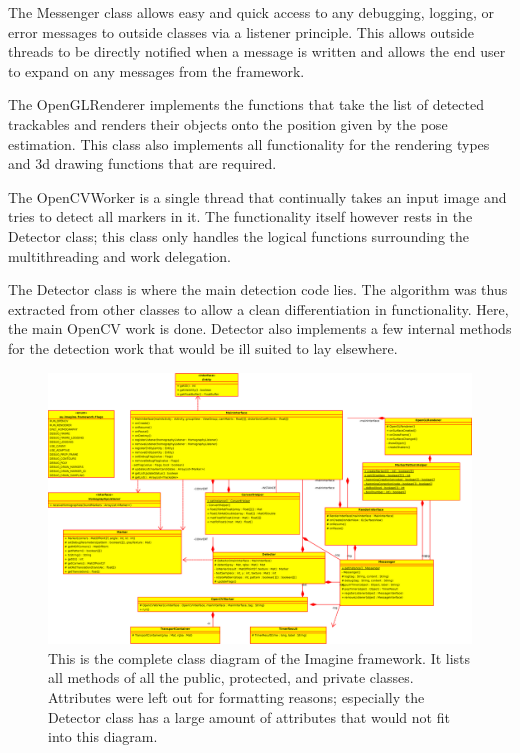 The Messenger class allows easy and quick access to any debugging, logging, or error messages to outside classes via a listener principle.
This allows outside threads to be directly notified when a message is written and allows the end user to expand on any messages from the framework.

The OpenGLRenderer implements the functions that take the list of detected trackables and renders their objects onto the position given by the pose estimation.
This class also implements all functionality for the rendering types and 3d drawing functions that are required.

The OpenCVWorker is a single thread that continually takes an input image and tries to detect all markers in it.
The functionality itself however rests in the Detector class; this class only handles the logical functions surrounding the multithreading and work delegation.

The Detector class is where the main detection code lies.
The algorithm was thus extracted from other classes to allow a clean differentiation in functionality.
Here, the main OpenCV work is done.
Detector also implements a few internal methods for the detection work that would be ill suited to lay elsewhere.

\begin{figure}
	\centering
	\includegraphics[width=21cm]{img/complete_class_diagram.eps}
	\caption[Complete Class Diagram]{This is the complete class diagram of the Imagine framework. It lists all methods of all the public, protected, and private classes. Attributes were left out for formatting reasons; especially the Detector class has a large amount of attributes that would not fit into this diagram.}
	\label{fig:complete_class_diagram}
\end{figure}

